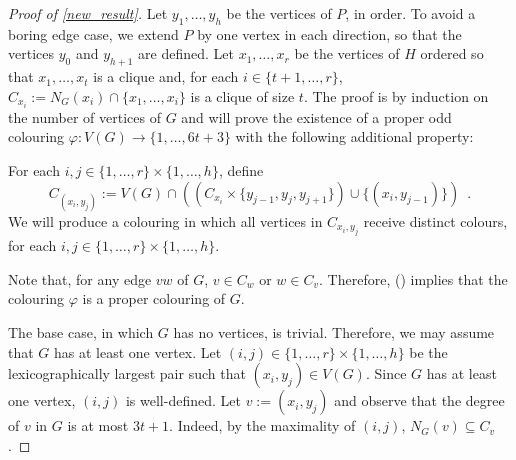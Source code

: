\documentclass{patmorin}
\begin{document}
\begin{proof}[Proof of \cref{new_result}]
  Let $y_1,\ldots,y_h$ be the vertices of $P$, in order.  To avoid a boring edge case, we extend $P$ by one vertex in each direction, so that the vertices $y_0$ and $y_{h+1}$ are defined.  Let $x_1,\ldots,x_r$ be the vertices of $H$ ordered so that $x_1,\ldots,x_{t}$ is a clique and, for each $i\in\{t+1,\ldots,r\}$, $C_{x_i}:=N_G(x_i)\cap\{x_1,\ldots,x_{i}\}$ is a clique of size $t$.  The proof is by induction on the number of vertices of $G$ and will prove the existence of a proper odd colouring $\varphi:V(G)\to\{1,\ldots,6t+3\}$ with the following additional property:
  \begin{compactitem}[(\ding{96})]
    \item For each $i,j\in\{1,\ldots,r\}\times \{1,\ldots,h\}$, define
    \[
      C_{(x_i,y_j)}:=V(G)\cap ((C_{x_i}\times\{y_{j-1}, y_{j},y_{j+1}\})\cup\{(x_i,y_{j-1})\})
      \enspace .
    \]
    We will produce a colouring in which all vertices in $C_{x_i,y_j}$ receive distinct colours, for each $i,j\in\{1,\ldots,r\}\times\{1,\ldots,h\}$.
  \end{compactitem}
  Note that, for any edge $vw$ of $G$, $v \in C_w$ or $w\in C_v$.  Therefore, () implies that the colouring $\varphi$ is a proper colouring of $G$.



  The base case, in which $G$ has no vertices, is trivial. Therefore, we may assume that $G$ has at least one vertex.  Let $(i,j)\in\{1,\ldots,r\}\times\{1,\ldots,h\}$ be the lexicographically largest pair such that $(x_i,y_j)\in V(G)$.  Since $G$ has at least one vertex, $(i,j)$ is well-defined.  Let $v:=(x_i,y_j)$ and observe that the degree of $v$ in $G$ is at most $3t+1$. Indeed, by the maximality of $(i,j)$,  $N_G(v)\subseteq C_v$.


\end{proof}
\end{document}
